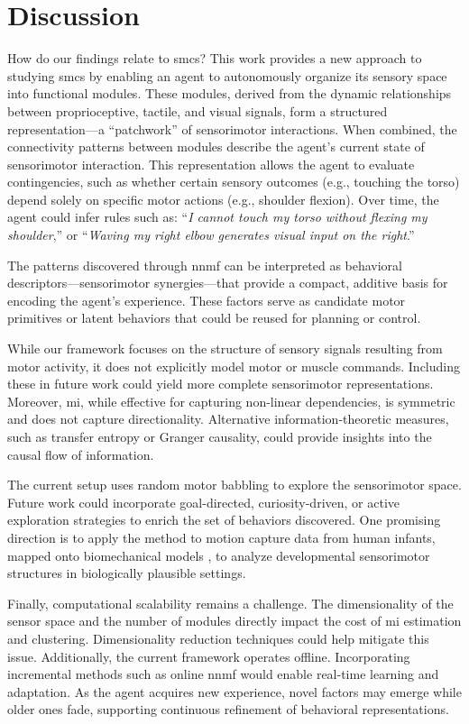 \documentclass[letterpaper, 10 pt, conference]{ieeeconf}  %
\begin{document}
\section{Discussion}
How do our findings relate to \acp{smc}? This work provides a new approach to studying \acp{smc} by enabling an agent to autonomously organize its sensory space into functional modules. These modules, derived from the dynamic relationships between proprioceptive, tactile, and visual signals, form a structured representation---a ``patchwork'' of sensorimotor interactions. When combined, the connectivity patterns between modules describe the agent’s current state of sensorimotor interaction. This representation allows the agent to evaluate contingencies, such as whether certain sensory outcomes (e.g., touching the torso) depend solely on specific motor actions (e.g., shoulder flexion). Over time, the agent could infer rules such as: ``\emph{I cannot touch my torso without flexing my shoulder},'' or ``\emph{Waving my right elbow generates visual input on the right}.''

The patterns discovered through \ac{nnmf} can be interpreted as behavioral descriptors---sensorimotor synergies---that provide a compact, additive basis for encoding the agent’s experience. These factors serve as candidate motor primitives or latent behaviors that could be reused for planning or control.

While our framework focuses on the structure of sensory signals resulting from motor activity, it does not explicitly model motor or muscle commands. Including these in future work could yield more complete sensorimotor representations. Moreover, \ac{mi}, while effective for capturing non-linear dependencies, is symmetric and does not capture directionality. Alternative information-theoretic measures, such as transfer entropy or Granger causality, could provide insights into the causal flow of information.

The current setup uses random motor babbling to explore the sensorimotor space. Future work could incorporate goal-directed, curiosity-driven, or active exploration strategies to enrich the set of behaviors discovered. One promising direction is to apply the method to motion capture data from human infants, mapped onto biomechanical models \cite{Kanazawa2023Openendedmovements}, to analyze developmental sensorimotor structures in biologically plausible settings.

Finally, computational scalability remains a challenge. The dimensionality of the sensor space and the number of modules directly impact the cost of \ac{mi} estimation and clustering. Dimensionality reduction techniques could help mitigate this issue. Additionally, the current framework operates offline. Incorporating incremental methods such as online \ac{nnmf} \cite{Bucak2007} would enable real-time learning and adaptation. As the agent acquires new experience, novel factors may emerge while older ones fade, supporting continuous refinement of behavioral representations.

\printbibliography 
\end{document}
